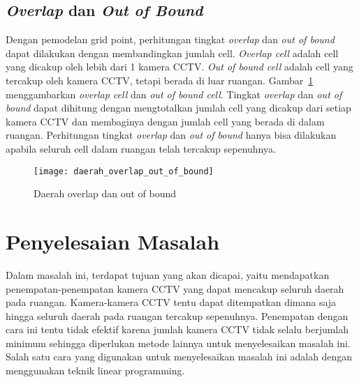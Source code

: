\subsection{\textit{Overlap} dan \textit{Out of Bound}}
Dengan pemodelan grid point, perhitungan tingkat \textit{overlap} dan \textit{out of bound} dapat dilakukan dengan membandingkan jumlah cell. \textit{Overlap cell} adalah cell yang dicakup oleh lebih dari 1 kamera CCTV. \textit{Out of bound cell} adalah cell yang tercakup oleh kamera CCTV, tetapi berada di luar ruangan. Gambar~\ref{fig:daerah_overlap_out_of_bound} menggambarkan \textit{overlap cell} dan \textit{out of bound cell}. Tingkat \textit{overlap} dan \textit{out of bound} dapat dihitung dengan mengtotalkan jumlah cell yang dicakup dari setiap kamera CCTV dan membaginya dengan jumlah cell yang berada di dalam ruangan. Perhitungan tingkat \textit{overlap} dan \textit{out of bound} hanya bisa dilakukan apabila seluruh cell dalam ruangan telah tercakup sepenuhnya.

\begin{figure}[h]
	\centering  
	\texttt{[image: daerah\_overlap\_out\_of\_bound]}
	\caption[Daerah overlap dan out of bound]{Daerah overlap dan out of bound}
	\label{fig:daerah_overlap_out_of_bound}
\end{figure}



\section{Penyelesaian Masalah}
Dalam masalah ini, terdapat tujuan yang akan dicapai, yaitu mendapatkan penempatan-penempatan kamera CCTV yang dapat mencakup seluruh daerah pada ruangan. Kamera-kamera CCTV tentu dapat ditempatkan dimana saja hingga seluruh daerah pada ruangan tercakup sepenuhnya. Penempatan dengan cara ini tentu tidak efektif karena jumlah kamera CCTV tidak selalu berjumlah minimum sehingga diperlukan metode lainnya untuk menyelesaikan masalah ini. Salah satu cara yang digunakan untuk menyelesaikan masalah ini adalah dengan menggunakan teknik linear programming.


